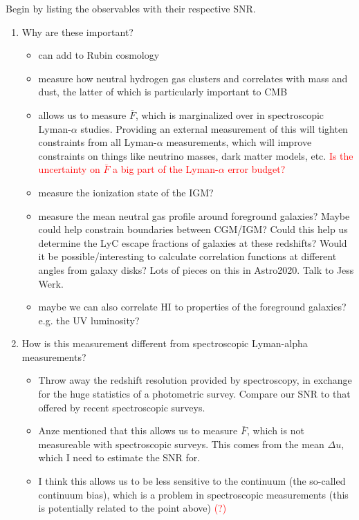 \documentclass[twocolumn]{aastex631}
\newcommand{\note}[1]{\textsf{\textcolor{red}{#1}}\xspace}
\newcommand{\lya}{Lyman-$\alpha$\xspace}
\begin{document}
Begin by listing the observables with their respective SNR.

\begin{enumerate}
    \item Why are these important?
    \begin{itemize}
        \item can add to Rubin cosmology
        \item measure how neutral hydrogen gas clusters and correlates with mass and dust, the latter of which is particularly important to CMB
        \item allows us to measure $\bar{F}$, which is marginalized over in spectroscopic \lya studies.
        Providing an external measurement of this will tighten constraints from all \lya measurements, which will improve constraints on things like neutrino masses, dark matter models, etc.
        \note{Is the uncertainty on $\bar{F}$ a big part of the \lya error budget?}
        \item measure the ionization state of the IGM?
        \item measure the mean neutral gas profile around foreground galaxies? Maybe could help constrain boundaries between CGM/IGM? Could this help us determine the LyC escape fractions of galaxies at these redshifts? Would it be possible/interesting to calculate correlation functions at different angles from galaxy disks? Lots of pieces on this in Astro2020. Talk to Jess Werk.
        \item maybe we can also correlate HI to properties of the foreground galaxies? e.g. the UV luminosity?
    \end{itemize}
    
    \item How is this measurement different from spectroscopic Lyman-alpha measurements?
    \begin{itemize}
        \item Throw away the redshift resolution provided by spectroscopy, in exchange for the huge statistics of a photometric survey. Compare our SNR to that offered by recent spectroscopic surveys.
        \item Anze mentioned that this allows us to measure $\bar{F}$, which is not measureable with spectroscopic surveys.
        This comes from the mean $\Delta u$, which I need to estimate the SNR for.
        \item I think this allows us to be less sensitive to the continuum (the so-called continuum bias), which is a problem in spectroscopic measurements (this is potentially related to the point above) \note{(?)}
    \end{itemize}
    

\end{enumerate}
\end{document}
